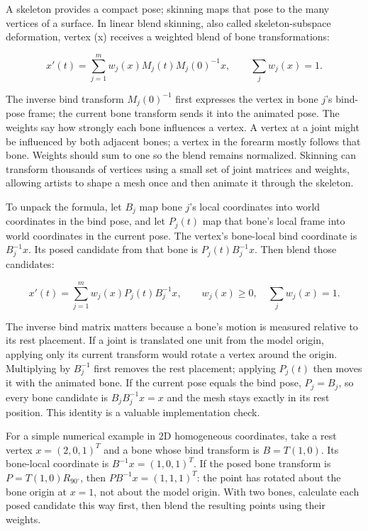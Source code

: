 A skeleton provides a compact pose; skinning maps that pose to the many vertices of a surface. In linear blend skinning, also called skeleton-subspace deformation, vertex (x) receives a weighted blend of bone transformations:

\[
x'(t)=\sum_{j=1}^{m}w_j(x)M_j(t)M_j(0)^{-1}x,\qquad \sum_j w_j(x)=1.
\]

The inverse bind transform \(M_j(0)^{-1}\) first expresses the vertex in bone \(j\)'s bind-pose frame; the current bone transform sends it into the animated pose. The weights say how strongly each bone influences a vertex. A vertex at a joint might be influenced by both adjacent bones; a vertex in the forearm mostly follows that bone. Weights should sum to one so the blend remains normalized. Skinning can transform thousands of vertices using a small set of joint matrices and weights, allowing artists to shape a mesh once and then animate it through the skeleton.

To unpack the formula, let \(B_j\) map bone \(j\)'s local coordinates into world coordinates in the bind pose, and let \(P_j(t)\) map that bone's local frame into world coordinates in the current pose. The vertex's bone-local bind coordinate is \(B_j^{-1}x\). Its posed candidate from that bone is \(P_j(t)B_j^{-1}x\). Then blend those candidates:

\[
x'(t)=\sum_{j=1}^{m}w_j(x)P_j(t)B_j^{-1}x,\qquad
w_j(x)\ge0,\quad\sum_jw_j(x)=1.
\]

The inverse bind matrix matters because a bone's motion is measured relative to its rest placement. If a joint is translated one unit from the model origin, applying only its current transform would rotate a vertex around the origin. Multiplying by \(B_j^{-1}\) first removes the rest placement; applying \(P_j(t)\) then moves it with the animated bone. If the current pose equals the bind pose, \(P_j=B_j\), so every bone candidate is \(B_jB_j^{-1}x=x\) and the mesh stays exactly in its rest position. This identity is a valuable implementation check.

For a simple numerical example in 2D homogeneous coordinates, take a rest vertex \(x=(2,0,1)^T\) and a bone whose bind transform is \(B=T(1,0)\). Its bone-local coordinate is \(B^{-1}x=(1,0,1)^T\). If the posed bone transform is \(P=T(1,0)R_{90^\circ}\), then \(PB^{-1}x=(1,1,1)^T\): the point has rotated about the bone origin at \(x=1\), not about the model origin. With two bones, calculate each posed candidate this way first, then blend the resulting points using their weights.

